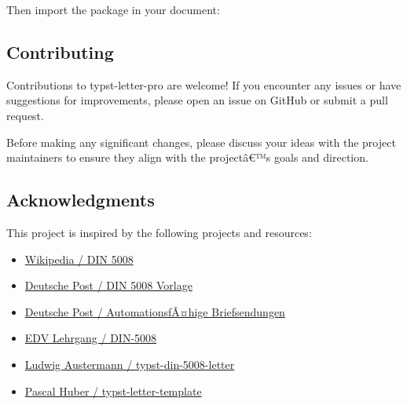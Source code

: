 \begin{Shaded}
\begin{Highlighting}[]
\ExtensionTok{$}
\end{Highlighting}
\end{Shaded}

Then import the package in your document:

\begin{Shaded}
\begin{Highlighting}[]
\end{Highlighting}
\end{Shaded}

\subsection{Contributing}\label{contributing}

Contributions to typst-letter-pro are welcome! If you encounter any
issues or have suggestions for improvements, please open an issue on
GitHub or submit a pull request.

Before making any significant changes, please discuss your ideas with
the project maintainers to ensure they align with the projectâ€™s goals
and direction.

\subsection{Acknowledgments}\label{acknowledgments}

This project is inspired by the following projects and resources:

\begin{itemize}
\tightlist
\item
  \href{https://de.wikipedia.org/wiki/DIN_5008}{Wikipedia / DIN 5008}
\item
  \href{https://web.archive.org/web/20240223035339/https://www.deutschepost.de/de/b/briefvorlagen/normbrief-din-5008-vorlage.html}{Deutsche
  Post / DIN 5008 Vorlage}
\item
  \href{https://www.deutschepost.de/dam/dpag/images/P_p/printmailing/downloads/dp-automationsfaehige-briefsendungen-2024.pdf}{Deutsche
  Post / AutomationsfÃ¤hige Briefsendungen}
\item
  \href{https://www.edv-lehrgang.de/din-5008/}{EDV Lehrgang / DIN-5008}
\item
  \href{https://github.com/ludwig-austermann/typst-din-5008-letter}{Ludwig
  Austermann / typst-din-5008-letter}
\item
  \href{https://github.com/pascal-huber/typst-letter-template}{Pascal
  Huber / typst-letter-template}
\end{itemize}

